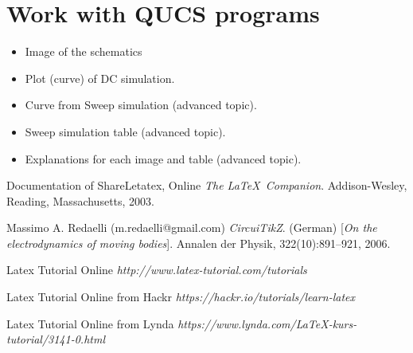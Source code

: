 \documentclass{report}
\begin{document}
 
 
 \section{Work with QUCS programs}


\begin{itemize}
\item Image of the schematics
\item Plot (curve) of DC simulation.
\item Curve from Sweep simulation (advanced topic).
\item Sweep simulation table (advanced topic).
\item Explanations for each image and table (advanced topic).
\end{itemize}




\begin{thebibliography}{9}
Documentation of ShareLetatex, Online
\textit{The \LaTeX\ Companion}. 
Addison-Wesley, Reading, Massachusetts, 2003.
 
Massimo A. Redaelli (m.redaelli@gmail.com)
\textit{CircuiTikZ}. (German) 
[\textit{On the electrodynamics of moving bodies}]. 
Annalen der Physik, 322(10):891–921, 2006.
 
Latex Tutorial Online
\textit{http://www.latex-tutorial.com/tutorials}

Latex Tutorial Online from Hackr
\textit{https://hackr.io/tutorials/learn-latex}


Latex Tutorial Online from Lynda
\textit{https://www.lynda.com/LaTeX-kurs-tutorial/3141-0.html}
\end{thebibliography}
\end{document}
